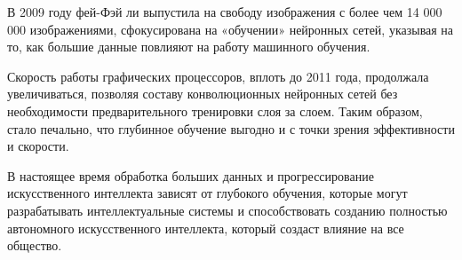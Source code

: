 В 2009 году фей-Фэй ли выпустила на свободу изображения
с более чем 14 000 000 изображениями,
сфокусирована на «обучении» нейронных сетей, указывая на то,
как большие данные повлияют на работу машинного обучения.

Скорость работы графических процессоров, вплоть до 2011 года,
продолжала увеличиваться, позволяя составу конволюционных нейронных
сетей без необходимости предварительного тренировки слоя за слоем.
Таким образом, стало печально, что глубинное обучение выгодно и
с точки зрения эффективности и скорости.

В настоящее время обработка больших данных и прогрессирование искусственного интеллекта зависят от глубокого обучения,
которые могут разрабатывать интеллектуальные системы и способствовать созданию полностью автономного искусственного интеллекта,
который создаст влияние на все общество.
